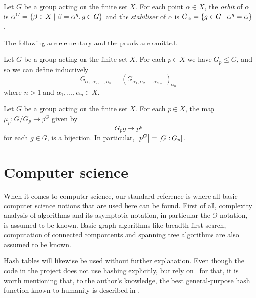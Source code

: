 \begin{deff}
Let $G$ be a group acting on the finite set $X$. For each point
$\alpha \in X$, the \emph{orbit} of $\alpha$ is $\alpha^G = \left\lbrace \beta
\in X \mid \beta = \alpha^g, g \in G \right\rbrace$ and the \emph{stabiliser} of
$\alpha$ is $G_{\alpha} = \left\lbrace g \in G \mid \alpha^g = \alpha \right\rbrace$.
\end{deff}

The following are elementary and the proofs are omitted.
\begin{pr}
Let $G$ be a group acting on the finite set $X$. For each $p \in X$ we have $G_p \leq G$, and so we can define inductively 
\begin{equation}
G_{\alpha_1, \alpha_2, \dotsc, \alpha_n} = (G_{\alpha_1, \alpha_2, \dotsc, \alpha_{n - 1}})_{\alpha_n}
\end{equation}
where $n > 1$ and $\alpha_1, \dotsc, \alpha_n \in X$.
\end{pr}

\begin{pr} \label{thm_orbit_stab}
Let $G$ be a group acting on the finite set $X$. For each $p \in X$, the map $\mu_p : G / G_p \to p^G$ given by
\begin{equation}
G_p g \mapsto p^g
\end{equation}
for each $g \in G$, is a bijection. In particular, $\left\lvert p^G \right\rvert = [G : G_p]$.
\end{pr}

\section{Computer science}
When it comes to computer science, our standard reference is
\cite{clr90} where all basic computer science notions that are used here can be
found. First of all, complexity analysis of algorithms and its
asymptotic notation, in particular the $O$-notation, is assumed to be
known. Basic graph algorithms like breadth-first search, computation
of connected compontents and spanning tree algorithms are also assumed to be known.

Hash tables will likewise be used without further explanation. Even
though the code in the project does not use hashing explicitly, but
rely on \GAP~for that, it is worth mentioning that, to the author's
knowledge, the best general-purpose hash function known to humanity is
described in \cite{jenkins97}.
